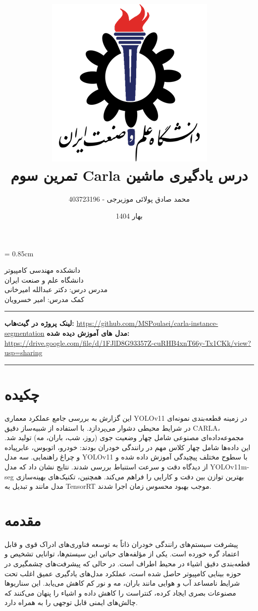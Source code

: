 \documentclass[oneside]{report}
\title{
    \includegraphics[width=0.5\linewidth]{images/iust.png}
    \\
    تمرین سوم Carla درس یادگیری ماشین
    }
\author{محمد صادق پولائی موزیرجی - 403723196}
\date{بهار 1404}
\begin{document}
\maketitle
\tableofcontents
\listoffigures
\listoftables

\baselineskip = 0.85cm

\newpage
\begin{center}
  دانشکده مهندسی کامپیوتر \\
  دانشگاه علم و صنعت ایران \\[1ex]
  مدرس درس: دکتر عبدالله امیرخانی \\
  کمک مدرس: امیر خسرویان
  \vspace{2cm}
  \hrule
  \vspace{0.5cm}
  \textbf{لینک پروژه در گیت‌هاب:} \url{https://github.com/MSPoulaei/carla-instance-segmentation}
  \textbf{مدل های آموزش دیده شده:} \url{https://drive.google.com/file/d/1FJlD8G93357Z-cuRHB4xnT66y-Tx1CKk/view?usp=sharing}

\end{center}

\hrule
\chapter{چکیده}
این گزارش به بررسی جامع عملکرد معماری YOLOv11 در زمینه قطعه‌بندی نمونه‌ای  در شرایط محیطی دشوار می‌پردازد. با استفاده از شبیه‌ساز دقیق CARLA، مجموعه‌داده‌ای مصنوعی شامل چهار وضعیت جوی (روز، شب، باران، مه) تولید شد. این داده‌ها شامل چهار کلاس مهم در رانندگی خودران بودند: خودرو، اتوبوس، عابرپیاده و چراغ‌ راهنمایی. سه مدل YOLOv11 با سطوح مختلف پیچیدگی  آموزش داده شده و از دیدگاه دقت و سرعت استنباط بررسی شدند. نتایج نشان داد که مدل YOLOv11m-seg بهترین توازن بین دقت و کارایی را فراهم می‌کند. همچنین، تکنیک‌های بهینه‌سازی مدل مانند  و تبدیل به TensorRT موجب بهبود محسوس زمان اجرا شدند.

\newpage

\chapter{مقدمه}
پیشرفت سیستم‌های رانندگی خودران ذاتاً به توسعه فناوری‌های ادراک قوی و قابل اعتماد گره خورده است. یکی از مؤلفه‌های حیاتی این سیستم‌ها، توانایی تشخیص و قطعه‌بندی دقیق اشیاء در محیط اطراف است. در حالی که پیشرفت‌های چشمگیری در حوزه بینایی کامپیوتر حاصل شده است، عملکرد مدل‌های یادگیری عمیق اغلب تحت شرایط نامساعد آب و هوایی مانند باران، مه و نور کم کاهش می‌یابد. این سناریوها مصنوعات بصری ایجاد کرده، کنتراست را کاهش داده و اشیاء را پنهان می‌کنند که چالش‌های ایمنی قابل توجهی را به همراه دارد.
\end{document}
